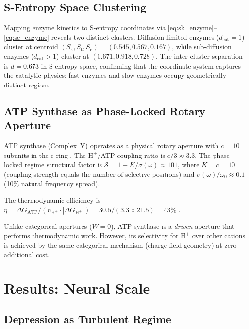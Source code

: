 \documentclass[twocolumn,10pt]{article}
\newcommand{\Sk}{S_{\mathrm{k}}}
\newcommand{\St}{S_{\mathrm{t}}}
\newcommand{\Se}{S_{\mathrm{e}}}
\newcommand{\dcat}{d_{\mathrm{cat}}}
\newcommand{\Hplus}{\mathrm{H}^{+}}
\begin{document}
\subsection{S-Entropy Space Clustering}

Mapping enzyme kinetics to S-entropy coordinates via \eqref{eq:sk_enzyme}--\eqref{eq:se_enzyme} reveals two distinct clusters.  Diffusion-limited enzymes ($\dcat = 1$) cluster at centroid $(\Sk, \St, \Se) = (0.545, 0.567, 0.167)$, while sub-diffusion enzymes ($\dcat > 1$) cluster at $(0.671, 0.918, 0.728)$.  The inter-cluster separation is $d = 0.673$ in S-entropy space, confirming that the coordinate system captures the catalytic physics: fast enzymes and slow enzymes occupy geometrically distinct regions.

\subsection{ATP Synthase as Phase-Locked Rotary Aperture}

ATP synthase (Complex~V) operates as a physical rotary aperture with $c = 10$ subunits in the c-ring \citep{stock1999molecular, yoshida2001atp}.  The $\Hplus$/ATP coupling ratio is $c/3 \approx 3.3$.  The phase-locked regime structural factor is $\mathcal{S} = 1 + K/\sigma(\omega) \approx 101$, where $K = c = 10$ (coupling strength equals the number of selective positions) and $\sigma(\omega)/\omega_{0} \approx 0.1$ (10\% natural frequency spread).

The thermodynamic efficiency is $\eta = \Delta G_{\mathrm{ATP}} / (n_{\Hplus} \cdot |\Delta G_{\Hplus}|) = 30.5 / (3.3 \times 21.5) = 43\%$ \citep{nicholls2013bioenergetics, boyer1997atp}.

Unlike categorical apertures ($W = 0$), ATP synthase is a \emph{driven} aperture that performs thermodynamic work.  However, its selectivity for $\Hplus$ over other cations is achieved by the same categorical mechanism (charge field geometry) at zero additional cost.

\section{Results: Neural Scale}
\label{sec:neural}

\subsection{Depression as Turbulent Regime}
\end{document}
